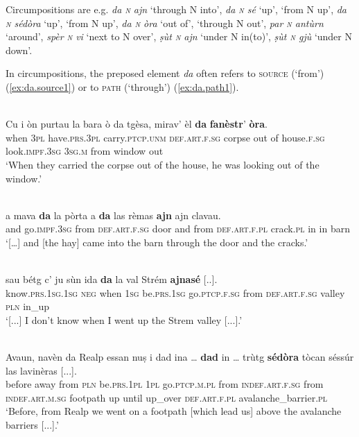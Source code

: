 Circumpositions are e.g. \textit{da \textsc{n} ajn} `through N into', \textit{da \textsc{n} sé} `up', `from N up', \textit{da \textsc{n} sédòra} `up', `from N up', \textit{da \textsc{n} òra} `out of', `through N out', \textit{par \textsc{n} antùrn} `around', \textit{spèr \textsc{n} vi} `next to N over', \textit{ṣùt \textsc{n} ajn} `under N in(to)', \textit{ṣùt \textsc{n} gjù} `under N down'.

In circumpositions, the preposed element \textit{da} often refers to \textsc{source} (`from') (\ref{ex:da.source1}) or to \textsc{path} (`through') (\ref{ex:da.path1}).

\ea
\label{ex:da.source1}
\\
\gll Cu i òn purtau la bara ò da tgèsa, mirav’ èl \textbf{da} \textbf{fanèstr}’ \textbf{òra}.\\
when \textsc{3pl} have.\textsc{prs.3pl} carry.\textsc{ptcp.unm} \textsc{def.art.f.sg} corpse out of house.\textsc{f.sg}
look.\textsc{impf.3sg} \textsc{3sg.m} from window out\\
\glt `When they carried the corpse out of the house, he was looking out of the window.'
\z


\ea
\label{ex:da.path1}
\\
\gll […] a mava \textbf{da} la pòrta a \textbf{da} las rèmas \textbf{ajn} ajn clavau.\\
{} and go.\textsc{impf.3sg} from \textsc{def.art.f.sg} door and from \textsc{def.art.f.pl} crack.\textsc{pl} in in barn \\
\glt `[…] and [the hay] came into the barn through the door and the cracks.'
\z

\ea
\label{}
\\
\gll  [...] sau bétg c’ ju sùn ida \textbf{da} la val Strém \textbf{ajnasé} [..].\\
{} know.\textsc{prs.1sg.1sg} \textsc{neg} when \textsc{1sg} be.\textsc{prs.1sg} go.\textsc{ptcp.f.sg} from \textsc{def.art.f.sg} valley \textsc{pln} in\_up\\
\glt `[...] I don’t know when I went up the Strem valley [...].'
\z

\ea
\label{}
\\
\gll  Avaun, navèn da Realp essan nuṣ i dad ina … \textbf{dad} in … trùtg \textbf{sédòra} tòcan séssúr las lavinèras [...]. \\
before away from \textsc{pln} be.\textsc{prs.1pl} \textsc{1pl} go.\textsc{ptcp.m.pl} from \textsc{indef.art.f.sg} {} from \textsc{indef.art.m.sg} {} footpath up until up\_over \textsc{def.art.f.pl} avalanche\_barrier.\textsc{pl} \\
\glt `Before, from Realp we went on a footpath [which lead us] above the avalanche barriers [...].'
\z

